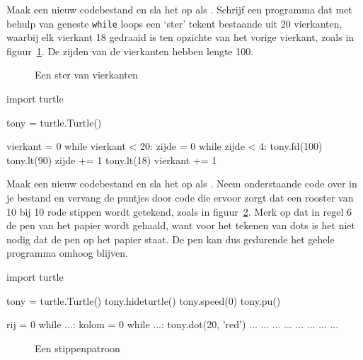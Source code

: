 \documentclass[../main]{subfiles}
\begin{document}
\begin{opgave}[icons={laptop}]
Maak een nieuw codebestand en sla het op als . Schrijf een programma dat met behulp van geneste \texttt{while} loops een `ster' tekent bestaande uit 20 vierkanten, waarbij elk vierkant 18\textdegree{} gedraaid is ten opzichte van het vorige vierkant, zoals in figuur~\ref{fig:turtle-squares-star}. De zijden van de vierkanten hebben lengte 100.

\begin{figure}[ht]
    \centering
    \caption{Een ster van vierkanten}%
    \label{fig:turtle-squares-star}
\end{figure}
\end{opgave}
\begin{antwoord}
\begin{python-breakable}[style=mu-noframe]
import turtle

tony = turtle.Turtle()

vierkant = 0
while vierkant < 20:
    zijde = 0
    while zijde < 4:
        tony.fd(100)
        tony.lt(90)
        zijde += 1
    tony.lt(18)
    vierkant += 1
\end{python-breakable}
\end{antwoord}
\begin{opgave}[icons={laptop}]
Maak een nieuw codebestand en sla het op als . Neem onderstaande code over in je bestand en vervang de puntjes door code die ervoor zorgt dat een rooster van 10 bij 10 rode stippen wordt getekend, zoals in figuur~\ref{fig:turtle-dot-pattern}. Merk op dat in regel 6 de pen van het papier wordt gehaald, want voor het tekenen van dots is het niet nodig dat de pen op het papier staat. De pen kan dus gedurende het gehele programma omhoog blijven.

\begin{python}[style=mu, caption={Basiscode voor een stippenpatroon}, label={lst:turtle-dot-pattern}]
import turtle

tony = turtle.Turtle()
tony.hideturtle()
tony.speed(0)
tony.pu()

rij = 0
while ...:
    kolom = 0
    while ...:
        tony.dot(20, 'red')
        ...
        ...
        ...
    ...
    ...
    ...
    ...
    ...
\end{python}

\begin{figure}[ht]
    \centering
    \caption{Een stippenpatroon}%
    \label{fig:turtle-dot-pattern}
\end{figure}
\end{opgave}
\end{document}
